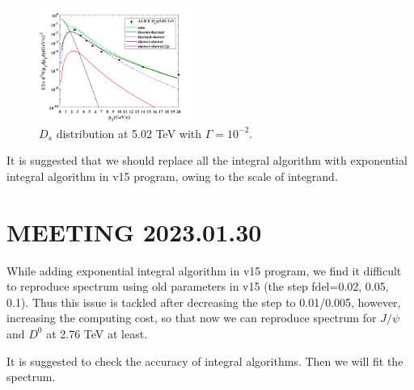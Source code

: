 \documentclass[twocolumn,aps,superscriptaddress,nofootinbib,floatfix]{revtex4}
\begin{document}
\begin{figure}[H]
	\includegraphics[width=0.45\textwidth]{Ds502_230109.png}
	\caption{$D_s$ distribution at 5.02 TeV with $\Gamma=10^{-2}$. }
	\label{fig42}
\end{figure}
It is suggested that we should replace all the integral algorithm with exponential integral algorithm in v15 program, owing to the scale of integrand.

\section{MEETING 2023.01.30}
While adding exponential integral algorithm in v15 program, we find it difficult to reproduce spectrum using old parameters in v15 (the step fdel=0.02, 0.05, 0.1). Thus this issue is tackled after decreasing the step to 0.01/0.005, however, increasing the computing cost, so that now we can reproduce spectrum for $J/\psi$ and $D^0$ at 2.76 TeV at least.

It is suggested to check the accuracy of integral algorithms. Then we will fit the spectrum.
\end{document}
